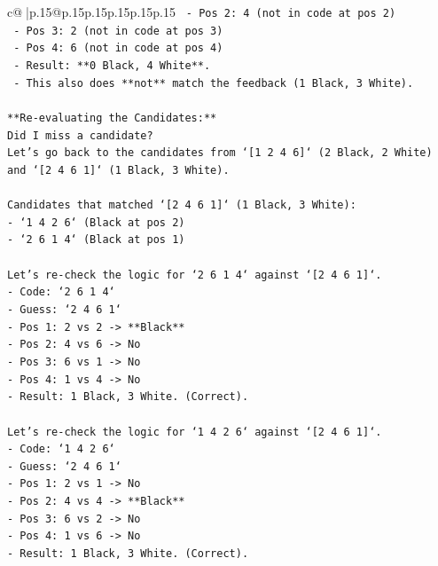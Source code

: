 \documentclass{article}
\begin{document}
{\begin{supertabular}{c@{$\;$}|p{.15\linewidth}@{}p{.15\linewidth}p{.15\linewidth}p{.15\linewidth}p{.15\linewidth}p{.15\linewidth}}
{{{\texttt{    {-} Pos 2: 4 (not in code at pos 2)} \\
\texttt{    {-} Pos 3: 2 (not in code at pos 3)} \\
\texttt{    {-} Pos 4: 6 (not in code at pos 4)} \\
\texttt{    {-} Result: **0 Black, 4 White**.} \\
\texttt{    {-} This also does **not** match the feedback (1 Black, 3 White).} \\
\\ 
\texttt{**Re{-}evaluating the Candidates:**} \\
\texttt{Did I miss a candidate?} \\
\texttt{Let's go back to the candidates from `{[}1 2 4 6{]}` (2 Black, 2 White) and `{[}2 4 6 1{]}` (1 Black, 3 White).} \\
\\ 
\texttt{Candidates that matched `{[}2 4 6 1{]}` (1 Black, 3 White):} \\
\texttt{{-} `1 4 2 6` (Black at pos 2)} \\
\texttt{{-} `2 6 1 4` (Black at pos 1)} \\
\\ 
\texttt{Let's re{-}check the logic for `2 6 1 4` against `{[}2 4 6 1{]}`.} \\
\texttt{{-} Code: `2 6 1 4`} \\
\texttt{{-} Guess: `2 4 6 1`} \\
\texttt{{-} Pos 1: 2 vs 2 {-}> **Black**} \\
\texttt{{-} Pos 2: 4 vs 6 {-}> No} \\
\texttt{{-} Pos 3: 6 vs 1 {-}> No} \\
\texttt{{-} Pos 4: 1 vs 4 {-}> No} \\
\texttt{{-} Result: 1 Black, 3 White. (Correct).} \\
\\ 
\texttt{Let's re{-}check the logic for `1 4 2 6` against `{[}2 4 6 1{]}`.} \\
\texttt{{-} Code: `1 4 2 6`} \\
\texttt{{-} Guess: `2 4 6 1`} \\
\texttt{{-} Pos 1: 2 vs 1 {-}> No} \\
\texttt{{-} Pos 2: 4 vs 4 {-}> **Black**} \\
\texttt{{-} Pos 3: 6 vs 2 {-}> No} \\
\texttt{{-} Pos 4: 1 vs 6 {-}> No} \\
\texttt{{-} Result: 1 Black, 3 White. (Correct).} \\
}}}
\end{supertabular}}
\end{document}
